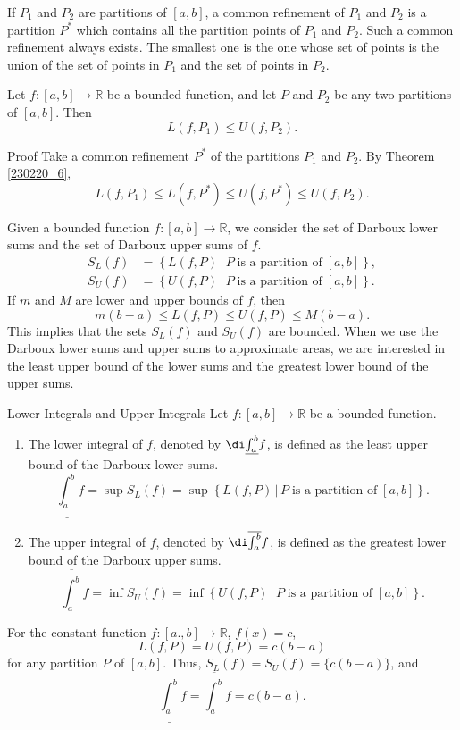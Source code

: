 If $P_1$ and $P_2$ are partitions of $[a,b]$, a common refinement of $P_1$ and $P_2$ is a partition $P^*$ which contains all the partition points of $P_1$ and $P_2$. Such a common refinement always exists. The smallest one is the one whose set of points is the union of the set of points in $P_1$ and the set of points in $P_2$.
\begin{corollary}[label=230220_7]{}
Let $f:[a,b]\to\mathbb{R}$ be a bounded function, and let $P$ and $P_2$ be any  two partitions of $[a,b]$. Then
\[L(f, P_1)\leq U(f, P_2).\]
\end{corollary}
\begin{myproof}{Proof}
Take a common refinement $P^*$ of the partitions $P_1$ and $P_2$. By Theorem \ref{230220_6},
\[L(f,P_1)\leq L(f,P^*)\leq U(f,P^*)\leq U(f,P_2).\]
\end{myproof}

Given a bounded function $f:[a,b]\to\mathbb{R}$, we consider the set of Darboux lower sums and the set of Darboux upper sums of $f$.
\begin{align*}
S_L(f)&=\left\{L(f,P)\,|\, P\;\text{is a partition of}\;[a,b]\right\},\\
S_U(f)&=\left\{U(f,P)\,|\, P\;\text{is a partition of}\;[a,b]\right\}.
\end{align*}If $m$ and $M$ are lower and upper bounds of $f$, then 
\[m(b-a)\leq L(f,P)\leq U(f,P)\leq M(b-a).\]
This implies that the sets $S_L(f)$ and $S_U(f)$ are bounded. When we use the Darboux lower sums and upper sums to approximate areas, we are interested in the least upper bound of the lower sums and the greatest lower bound of the upper sums.
\begin{definition}{Lower Integrals and Upper Integrals}
Let $f:[a,b]\to\mathbb{R}$ be a bounded function.
\begin{enumerate}[1.]
\item
The lower integral of $f$, denoted by $\di\underline{\int_a^b}f$, is defined as the least upper bound of the Darboux lower sums.
\[\underline{\int_a^b}f=\sup S_L(f)=\sup \left\{L(f,P)\,|\, P\;\text{is a partition of}\;[a,b]\right\}.\]
\item
The upper integral of $f$, denoted by $\di\overline{\int_a^b}f$, is defined as the greatest lower bound of the Darboux upper sums.
\[\overline{\int_a^b}f=\inf S_U(f)=\inf \left\{U(f,P)\,|\, P\;\text{is a partition of}\;[a,b]\right\}.\]
\end{enumerate}
\end{definition}

\begin{example}{}
For the constant function $f:[a.,b]\to\mathbb{R}$, $f(x)=c$, 
\[L(f,P)=U(f,P)=c(b-a)\] for any partition $P$ of $[a,b]$. Thus,
$S_L(f)=S_U(f)=\{c(b-a)\}$, and
\[\underline{\int_a^b}f=\overline{\int_a^b}f=c(b-a).\]
\end{example}

